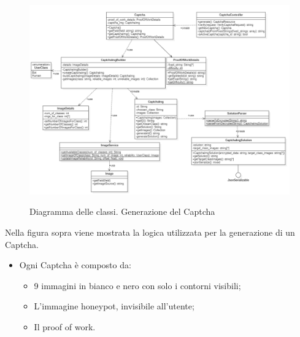 \begin{figure}[H]
    \centering
    \includegraphics[scale = 0.45]{img/generate.png}\\
    \caption{Diagramma delle classi. Generazione del Captcha}
\end{figure}
\newpage

Nella figura sopra viene mostrata la logica utilizzata per la generazione di un  Captcha.
\begin{itemize}
    \item  Ogni Captcha è composto da:
    \begin{itemize}
        \item 9 immagini in bianco e nero con solo i contorni visibili;
        \item L'immagine honeypot, invisibile all'utente;
        \item Il proof of work.
    \end{itemize}
\end{itemize}

